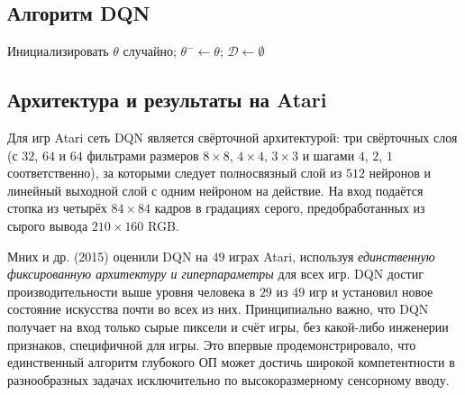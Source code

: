 \subsection{Алгоритм DQN}

\begin{algorithm}[ht]
\caption{Deep Q-Network (DQN)}
\label{alg:dqn}
Инициализировать $\theta$ случайно; $\theta^- \leftarrow \theta$; $\mathcal{D} \leftarrow \emptyset$\;
\end{algorithm}

\subsection{Архитектура и результаты на Atari}

Для игр Atari сеть DQN является свёрточной архитектурой: три свёрточных слоя (с $32$, $64$ и $64$ фильтрами размеров $8\times 8$, $4\times 4$, $3\times 3$ и шагами $4$, $2$, $1$ соответственно), за которыми следует полносвязный слой из $512$ нейронов и линейный выходной слой с одним нейроном на действие.  На вход подаётся стопка из четырёх $84\times 84$ кадров в градациях серого, предобработанных из сырого вывода $210\times 160$ RGB.

Мних и др. (2015) оценили DQN на $49$ играх Atari, используя \emph{единственную фиксированную архитектуру и гиперпараметры} для всех игр.  DQN достиг производительности выше уровня человека в $29$ из $49$ игр и установил новое состояние искусства почти во всех из них.  Принципиально важно, что DQN получает на вход только сырые пиксели и счёт игры, без какой-либо инженерии признаков, специфичной для игры.  Это впервые продемонстрировало, что единственный алгоритм глубокого ОП может достичь широкой компетентности в разнообразных задачах исключительно по высокоразмерному сенсорному вводу.

